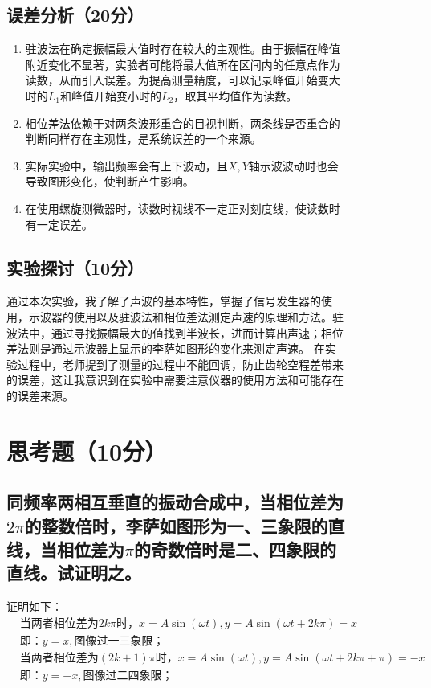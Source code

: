 \documentclass{../template/Report}
\begin{document}
\begin{fullreportonly}
\begin{figure}[H]
	\subsection{误差分析（20分）}
	\begin{enumerate}
    \item 驻波法在确定振幅最大值时存在较大的主观性。由于振幅在峰值附近变化不显著，实验者可能将最大值所在区间内的任意点作为读数，从而引入误差。为提高测量精度，可以记录峰值开始变大时的$L_1$和峰值开始变小时的$L_2$，取其平均值作为读数。
    \item 相位差法依赖于对两条波形重合的目视判断，两条线是否重合的判断同样存在主观性，是系统误差的一个来源。
    \item 实际实验中，输出频率会有上下波动，且$X, Y$轴示波波动时也会导致图形变化，使判断产生影响。
    \item 在使用螺旋测微器时，读数时视线不一定正对刻度线，使读数时有一定误差。
	\end{enumerate}

	\subsection{实验探讨（10分）}
	通过本次实验，我了解了声波的基本特性，掌握了信号发生器的使用，示波器的使用以及驻波法和相位差法测定声速的原理和方法。驻波法中，通过寻找振幅最大的值找到半波长，进而计算出声速；相位差法则是通过示波器上显示的李萨如图形的变化来测定声速。
	在实验过程中，老师提到了测量的过程中不能回调，防止齿轮空程差带来的误差，这让我意识到在实验中需要注意仪器的使用方法和可能存在的误差来源。
	\section{思考题（10分）}
	\subsection{同频率两相互垂直的振动合成中，当相位差为$2\pi$的整数倍时，李萨如图形为一、三象限的直线，当相位差为$\pi$的奇数倍时是二、四象限的直线。试证明之。}
	证明如下：
	\begin{align*}
		&\text{当两者相位差为}2k\pi\text{时}，x = A\sin(\omega t), y = A\sin(\omega t + 2k\pi) = x \\
		&\text{即：}y = x, \text{图像过一三象限；}\\
		&\text{当两者相位差为}(2k + 1)\pi\text{时}，x = A\sin(\omega t), y = A\sin(\omega t + 2k\pi + \pi) = -x \\
		&\text{即：}y = -x, \text{图像过二四象限；}\\
	\end{align*}

\end{figure}
\end{fullreportonly}
\end{document}
